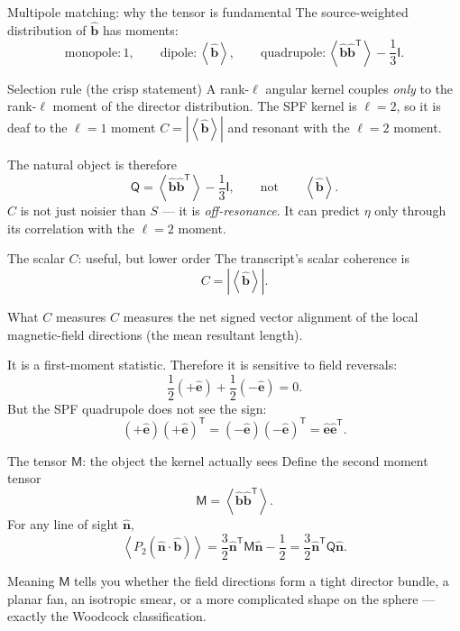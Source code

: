 \documentclass[aspectratio=169]{beamer}
\newcommand{\bn}{\hat{\bm n}}
\newcommand{\bb}{\hat{\bm b}}
\newcommand{\be}{\hat{\bm e}}
\newcommand{\I}{\mathsf I}
\newcommand{\T}{\mathsf T}
\newcommand{\avg}[1]{\left\langle #1 \right\rangle}
\newcommand{\Ptwo}{P_2}
\newcommand{\M}{\mathsf M}
\newcommand{\Qten}{\mathsf Q}
\begin{document}
\begin{frame}[t]{Multipole matching: why the tensor is fundamental}
The source-weighted distribution of $\bb$ has moments:
\[
\text{monopole}: 1,
\qquad
\text{dipole}: \avg{\bb},
\qquad
\text{quadrupole}: \avg{\bb\bb^\T}-\frac{1}{3}\I .
\]
\begin{block}{Selection rule (the crisp statement)}
A rank-$\ell$ angular kernel couples \emph{only} to the rank-$\ell$ moment of the director distribution. The SPF kernel is $\ell=2$, so it is deaf to the $\ell=1$ moment $C=|\avg{\bb}|$ and resonant with the $\ell=2$ moment.
\end{block}
The natural object is therefore
\[
\Qten = \avg{\bb\bb^\T}-\frac{1}{3}\I,
\qquad\text{not}\qquad \avg{\bb}.
\]
$C$ is not just noisier than $S$ --- it is \emph{off-resonance}. It can predict $\eta$ only through its correlation with the $\ell=2$ moment.
\end{frame}

\begin{frame}[t]{The scalar $C$: useful, but lower order}
The transcript's scalar coherence is
\[
C = \left|\avg{\bb}\right|.
\]
\begin{block}{What $C$ measures}
$C$ measures the net signed vector alignment of the local magnetic-field directions (the mean resultant length).
\end{block}
It is a first-moment statistic. Therefore it is sensitive to field reversals:
\[
\frac{1}{2}(+\be)+\frac{1}{2}(-\be)=0.
\]
But the SPF quadrupole does not see the sign:
\[
(+\be)(+\be)^\T=(-\be)(-\be)^\T=\be\be^\T.
\]
\end{frame}

\begin{frame}[t]{The tensor $\M$: the object the kernel actually sees}
Define the second moment tensor
\[
\M = \avg{\bb\bb^\T}.
\]
For any line of sight $\bn$,
\[
\avg{\Ptwo(\bn\cdot\bb)}
= \frac{3}{2}\bn^\T\M\bn-\frac{1}{2}
= \frac{3}{2}\bn^\T\Qten\bn.
\]
\begin{block}{Meaning}
$\M$ tells you whether the field directions form a tight director bundle, a planar fan, an isotropic smear, or a more complicated shape on the sphere --- exactly the Woodcock classification.
\end{block}
\end{frame}
\end{document}
